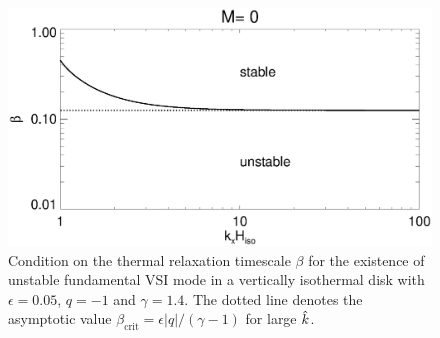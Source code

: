 \begin{figure}
  \includegraphics[width=\linewidth]{figures/bcrit_theory}
  \caption{Condition on the thermal relaxation timescale $\beta$ for
    the existence of unstable fundamental VSI mode in a vertically
    isothermal disk with $\epsilon=0.05$, $q=-1$ and $\gamma=1.4$.  
    The dotted line denotes the asymptotic value
    $\beta_\mathrm{crit}=\epsilon|q|/(\gamma-1)$ for large $\hat{k}$. 
    \label{relax_bcrit}}  
\end{figure}   




